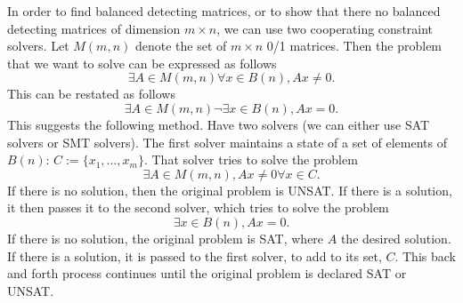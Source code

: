 \documentclass{article}
\begin{document}
In order to find balanced detecting matrices, or to show that there no
balanced detecting matrices of dimension $m \times n$, we can use two
cooperating constraint solvers.  Let $M(m,n)$ denote the set of $m \times n$ 0/1
matrices.  Then the problem that we want to solve can be expressed as
follows
\begin{equation}
  \label{eq:logical}
  \exists A \in M(m,n) \forall x \in B(n), Ax \ne 0.
\end{equation}
This can be restated as follows
\begin{equation}
  \label{eq:logical:restate}
  \exists A \in M(m,n) \neg \exists x \in B(n), Ax = 0.
\end{equation}
This suggests the following method.  Have two solvers (we can either
use SAT solvers or SMT solvers).  The first solver maintains a state
of a set of elements of $B(n)$: $C:=\{x_1, \dots, x_m\}$.  That solver
tries to solve the problem
\begin{displaymath}
  \exists A \in M(m,n), Ax \ne 0 \forall x \in C.
\end{displaymath}
If there is no solution, then the original problem is UNSAT.  If there
is a solution, it then passes it to the second solver, which tries to
solve the problem
\begin{displaymath}
  \exists x \in B(n), A x = 0.
\end{displaymath}
If there is no solution, the original problem is SAT, where $A$ the
desired solution.  If there is a solution, it is passed to the first
solver, to add to its set, $C$.  This back and forth process continues
until the original problem is declared SAT or UNSAT.
\end{document}
